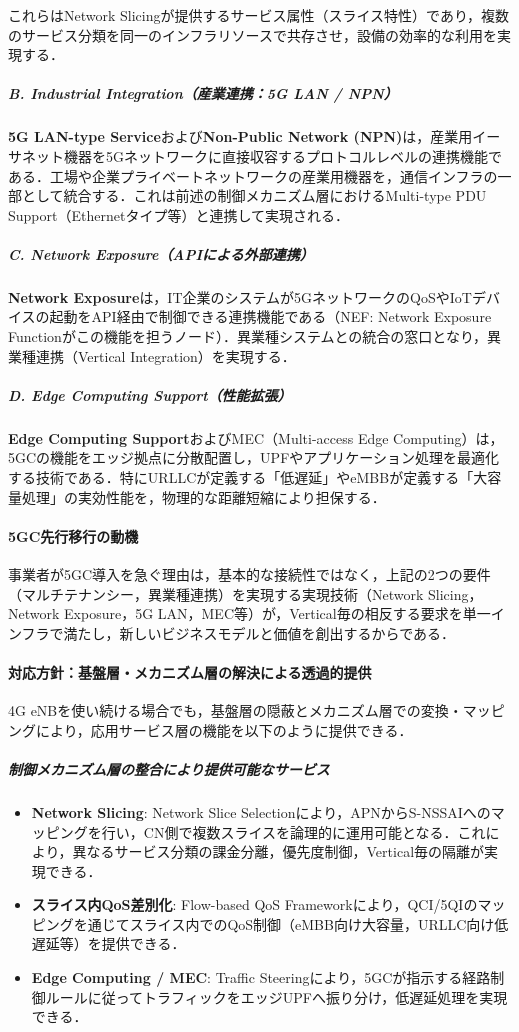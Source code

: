 これらはNetwork Slicingが提供するサービス属性（スライス特性）であり，複数のサービス分類を同一のインフラリソースで共存させ，設備の効率的な利用を実現する．

\subparagraph{B. Industrial Integration（産業連携：5G LAN / NPN）}

\textbf{5G LAN-type Service}および\textbf{Non-Public Network (NPN)}は，産業用イーサネット機器を5Gネットワークに直接収容するプロトコルレベルの連携機能である．工場や企業プライベートネットワークの産業用機器を，通信インフラの一部として統合する．これは前述の制御メカニズム層におけるMulti-type PDU Support（Ethernetタイプ等）と連携して実現される．

\subparagraph{C. Network Exposure（APIによる外部連携）}

\textbf{Network Exposure}は，IT企業のシステムが5GネットワークのQoSやIoTデバイスの起動をAPI経由で制御できる連携機能である（NEF: Network Exposure Functionがこの機能を担うノード）．異業種システムとの統合の窓口となり，異業種連携（Vertical Integration）を実現する．

\subparagraph{D. Edge Computing Support（性能拡張）}

\textbf{Edge Computing Support}およびMEC（Multi-access Edge Computing）は，5GCの機能をエッジ拠点に分散配置し，UPFやアプリケーション処理を最適化する技術である．特にURLLCが定義する「低遅延」やeMBBが定義する「大容量処理」の実効性能を，物理的な距離短縮により担保する．

\paragraph{5GC先行移行の動機}

事業者が5GC導入を急ぐ理由は，基本的な接続性ではなく，上記の2つの要件（マルチテナンシー，異業種連携）を実現する実現技術（Network Slicing，Network Exposure，5G LAN，MEC等）が，Vertical毎の相反する要求を単一インフラで満たし，新しいビジネスモデルと価値を創出するからである．

\paragraph{対応方針：基盤層・メカニズム層の解決による透過的提供}

4G eNBを使い続ける場合でも，基盤層の隠蔽とメカニズム層での変換・マッピングにより，応用サービス層の機能を以下のように提供できる．

\subparagraph{制御メカニズム層の整合により提供可能なサービス}

\begin{itemize}
\item \textbf{Network Slicing}: Network Slice Selectionにより，APNからS-NSSAIへのマッピングを行い，CN側で複数スライスを論理的に運用可能となる．これにより，異なるサービス分類の課金分離，優先度制御，Vertical毎の隔離が実現できる．
\item \textbf{スライス内QoS差別化}: Flow-based QoS Frameworkにより，QCI/5QIのマッピングを通じてスライス内でのQoS制御（eMBB向け大容量，URLLC向け低遅延等）を提供できる．
\item \textbf{Edge Computing / MEC}: Traffic Steeringにより，5GCが指示する経路制御ルールに従ってトラフィックをエッジUPFへ振り分け，低遅延処理を実現できる．
\end{itemize}

